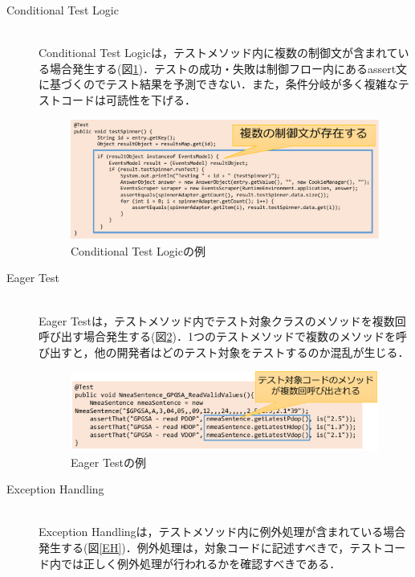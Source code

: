 \documentclass[12pt]{jarticle} %
\begin{document}
\begin{description}
\newpage
\item[Conditional Test Logic]~\\
Conditional Test Logicは，テストメソッド内に複数の制御文が含まれている場合発生する(図\ref{CTL})．テストの成功・失敗は制御フロー内にあるassert文に基づくのでテスト結果を予測できない．また，条件分岐が多く複雑なテストコードは可読性を下げる．

\begin{figure}[htbp]
  \begin{center}
    \includegraphics[clip,width=15cm]{CTL.pdf}
    \caption{Conditional Test Logicの例}
    \label{CTL}
  \end{center}
\end{figure}

\item[Eager Test]~\\
Eager Testは，テストメソッド内でテスト対象クラスのメソッドを複数回呼び出す場合発生する(図\ref{ET})．1つのテストメソッドで複数のメソッドを呼び出すと，他の開発者はどのテスト対象をテストするのか混乱が生じる．

\begin{figure}[htbp]
  \begin{center}
    \includegraphics[clip,width=15cm]{ET.pdf}
    \caption{Eager Testの例}
    \label{ET}
  \end{center}
\end{figure}

\item[Exception Handling]~\\
Exception Handlingは，テストメソッド内に例外処理が含まれている場合発生する(図\ref{EH})．例外処理は，対象コードに記述すべきで，テストコード内では正しく例外処理が行われるかを確認すべきである．


\end{description}
\end{document}
